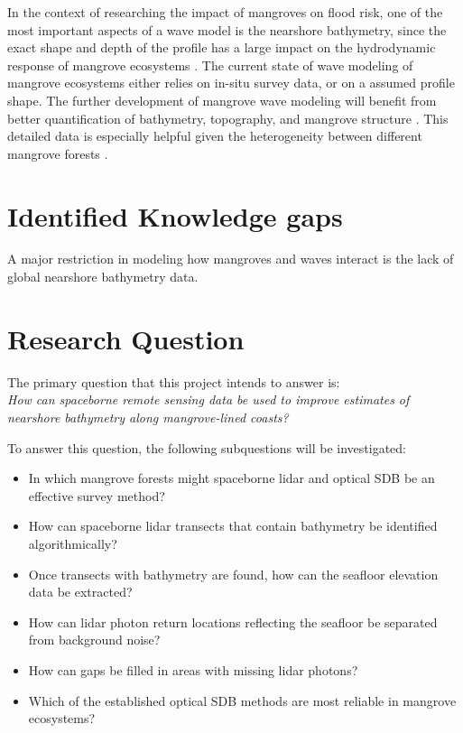 In the context of researching the impact of mangroves on flood risk, one of the most important aspects of a wave model is the nearshore bathymetry, since the exact shape and depth of the profile has a large impact on the hydrodynamic response of mangrove ecosystems \parencite{Horstman2014,Maza2019}. The current state of wave modeling of mangrove ecosystems either relies on in-situ survey data, or on a assumed profile shape. The further development of mangrove wave modeling will benefit from better quantification of bathymetry, topography, and mangrove structure \parencite{Menendez2020}. This detailed data is especially helpful given the heterogeneity between different mangrove forests \parencite{Mazda2013}.


\section{Identified Knowledge gaps}
A major restriction in modeling how mangroves and waves interact is the lack of global nearshore bathymetry data.
\section{Research Question}
The primary question that this project intends to answer is: \\

\emph{How can spaceborne remote sensing data be used to improve estimates of nearshore bathymetry along mangrove-lined coasts?}

To answer this question, the following subquestions will be investigated:

\begin{itemize}
      \item In which mangrove forests might spaceborne lidar and optical SDB be an effective survey method?
      \item How can spaceborne lidar transects that contain bathymetry be identified algorithmically?
      \item Once transects with bathymetry are found, how can the seafloor elevation data be extracted?
      \item How can lidar photon return locations reflecting the seafloor be separated from background noise?
      \item How can gaps be filled in areas with missing lidar photons?
      \item Which of the established optical SDB methods are most reliable in mangrove ecosystems?
\end{itemize}

